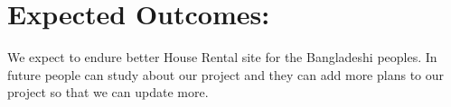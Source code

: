 \documentclass{article}
\begin{document}
\vspace{5cm}

\section{Expected Outcomes:}
We expect to endure better House Rental site for the Bangladeshi peoples. In future people can study about our project and they can add more plans to our project so that we can update more.
\end{document}
